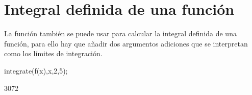 
\section{Integral definida de una función}
La función  también se puede usar para calcular
la integral definida de una función, para ello hay que añadir dos
argumentos adiciones que se interpretan como los límites de integración.
\begin{maximai}
 integrate(f(x),x,2,5);
\end{maximai}\begin{maximao}
 3072
\end{maximao}
